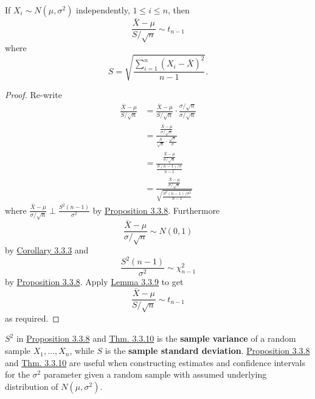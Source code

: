\documentclass[11pt,fleqn]{book} %
\begin{document}
\begin{theorem} \label{thm:3310}
If \(X_i \sim N(\mu, \sigma^2)\) independently, \(1 \leq i \leq n\), then
\[
\frac{\bar{X} - \mu}{S / \sqrt{n}} \sim t_{n-1}
\]
where
\[
S = \sqrt{\frac{\sum_{i=1}^n (X_i - \bar{X})^2}{n-1}}.
\]
\end{theorem}
\begin{proof} Re-write
\[
\begin{aligned}
\frac{\bar{X} - \mu}{S / \sqrt{n}} &= \frac{\bar{X} - \mu}{S / \sqrt{n}} \cdot \frac{\sigma/\sqrt{n}}{\sigma/\sqrt{n}} \\
&= \frac{\frac{\bar{X} - \mu}{\sigma/\sqrt{n}}}{\frac{S}{\sqrt{n}}\cdot\frac{\sqrt{n}}{\sigma}} \\
&= \frac{\frac{\bar{X} - \mu}{\sigma / \sqrt{n}}}{\frac{S(n-1)/\sigma}{n-1}} \\
&= \frac{\frac{\bar{X} - \mu}{\sigma / \sqrt{n}}}{\sqrt{\frac{S^2(n-1)/\sigma^2}{n-1}}}
\end{aligned}
\]
where \(\frac{\bar{X} - \mu}{\sigma/\sqrt{n}} \perp \frac{S^2(n-1)}{\sigma^2}\) by \hyperref[prop:338]{Proposition 3.3.8}. Furthermore
\[
\frac{\bar{X} - \mu}{\sigma/\sqrt{n}} \sim N(0, 1)
\]
by \hyperref[cor:333]{Corollary 3.3.3} and
\[
\frac{S^2(n-1)}{\sigma^2} \sim \chi^2_{n-1}
\]
by \hyperref[prop:338]{Proposition 3.3.8}. Apply \hyperref[lemma:339]{Lemma 3.3.9} to get
\[
\frac{\bar{X} - \mu}{S / \sqrt{n}} \sim t_{n-1}
\]
as required.
\end{proof}

\begin{remark} \label{rmk:3311}
\(S^2\) in \hyperref[prop:338]{Proposition 3.3.8} and \hyperref[thm:3310]{Thm. 3.3.10} is the \textbf{sample variance} of a random sample \(X_1, \ldots, X_n\), while \(S\) is the \textbf{sample standard deviation}. \hyperref[prop:338]{Proposition 3.3.8} and \hyperref[thm:3310]{Thm. 3.3.10} are useful when constructing estimates and confidence intervals for the \(\sigma^2\) parameter given a random sample with assumed underlying distribution of \(N(\mu, \sigma^2)\).
\end{remark}



\end{document}
